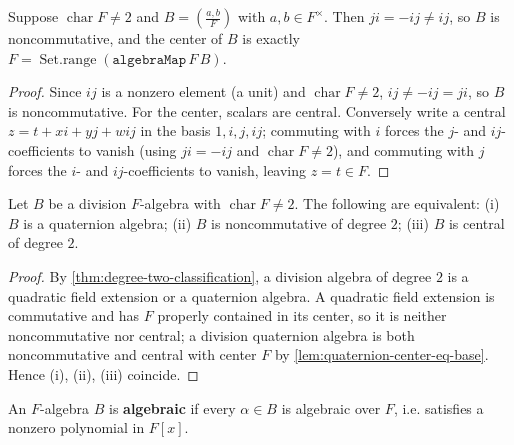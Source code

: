 \begin{lemma}
    \label{lem:quaternion-center-eq-base}
    Suppose $\operatorname{char} F \neq 2$ and $B = \left(\frac{a,b}{F}\right)$ with
    $a, b \in F^\times$. Then $ji = -ij \neq ij$, so $B$ is noncommutative, and the
    center of $B$ is exactly $F = \operatorname{Set.range}(\mathtt{algebraMap}\,F\,B)$.
\end{lemma}
\begin{proof}
    Since $ij$ is a nonzero element (a unit) and $\operatorname{char} F \neq 2$,
    $ij \neq -ij = ji$, so $B$ is noncommutative. For the center, scalars are
    central. Conversely write a central $z = t + xi + yj + wij$ in the basis
    $1, i, j, ij$; commuting with $i$ forces the $j$- and $ij$-coefficients to
    vanish (using $ji = -ij$ and $\operatorname{char} F \neq 2$), and commuting with
    $j$ forces the $i$- and $ij$-coefficients to vanish, leaving $z = t \in F$.
\end{proof}

\begin{corollary}
    \label{cor:quaternion-characterization}
    Let $B$ be a division $F$-algebra with $\operatorname{char} F \neq 2$. The
    following are equivalent: (i) $B$ is a quaternion algebra; (ii) $B$ is
    noncommutative of degree $2$; (iii) $B$ is central of degree $2$.
\end{corollary}
\begin{proof}
    By \ref{thm:degree-two-classification}, a division algebra of degree $2$ is a
    quadratic field extension or a quaternion algebra. A quadratic field extension
    is commutative and has $F$ properly contained in its center, so it is neither
    noncommutative nor central; a division quaternion algebra is both
    noncommutative and central with center $F$ by
    \ref{lem:quaternion-center-eq-base}. Hence (i), (ii), (iii) coincide.
\end{proof}

\begin{definition}
    \label{def:algebraic-algebra}
    An $F$-algebra $B$ is \textbf{algebraic} if every $\alpha \in B$ is algebraic
    over $F$, i.e. satisfies a nonzero polynomial in $F[x]$.
\end{definition}

